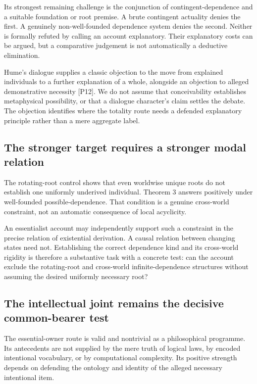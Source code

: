 \documentclass[11pt,a4paper]{article}
\begin{document}
Its strongest remaining challenge is the conjunction of
contingent-dependence and a suitable foundation or root premise. A brute
contingent actuality denies the first. A genuinely non-well-founded
dependence system denies the second. Neither is formally refuted by
calling an account explanatory. Their explanatory costs can be argued,
but a comparative judgement is not automatically a deductive
elimination.

Hume's dialogue supplies a classic objection to the move from explained
individuals to a further explanation of a whole, alongside an objection
to alleged demonstrative necessity {[}P12{]}. We do not assume that
conceivability establishes metaphysical possibility, or that a dialogue
character's claim settles the debate. The objection identifies where the
totality route needs a defended explanatory principle rather than a mere
aggregate label.

\subsection{The stronger target requires a stronger modal
relation}\label{the-stronger-target-requires-a-stronger-modal-relation}

The rotating-root control shows that even worldwise unique roots do not
establish one uniformly underived individual. Theorem 3 answers
positively under well-founded possible-dependence. That condition is a
genuine cross-world constraint, not an automatic consequence of local
acyclicity.

An essentialist account may independently support such a constraint in
the precise relation of existential derivation. A causal relation
between changing states need not. Establishing the correct dependence
kind and its cross-world rigidity is therefore a substantive task with a
concrete test: can the account exclude the rotating-root and cross-world
infinite-dependence structures without assuming the desired uniformly
necessary root?

\subsection{The intellectual joint remains the decisive common-bearer
test}\label{the-intellectual-joint-remains-the-decisive-common-bearer-test}

The essential-owner route is valid and nontrivial as a philosophical
programme. Its antecedents are not supplied by the mere truth of logical
laws, by encoded intentional vocabulary, or by computational complexity.
Its positive strength depends on defending the ontology and identity of
the alleged necessary intentional item.
\end{document}
